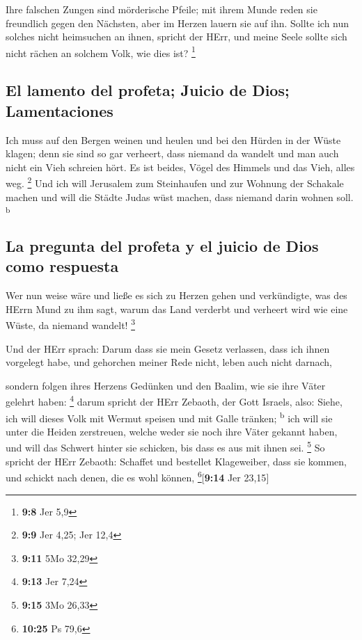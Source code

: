  Ihre falschen Zungen sind mörderische Pfeile; mit ihrem
Munde reden sie freundlich gegen den Nächsten, aber im Herzen lauern sie
auf ihn.  Sollte ich nun solches nicht heimsuchen an
ihnen, spricht der HErr, und meine Seele sollte sich nicht rächen an
solchem Volk, wie dies ist? \footnote{\textbf{9:8} Jer 5,9}

\hypertarget{el-lamento-del-profeta-juicio-de-dios-lamentaciones}{%
\subsection{El lamento del profeta; Juicio de Dios;
Lamentaciones}\label{el-lamento-del-profeta-juicio-de-dios-lamentaciones}}

 Ich muss auf den Bergen weinen und heulen und bei den
Hürden in der Wüste klagen; denn sie sind so gar verheert, dass niemand
da wandelt und man auch nicht ein Vieh schreien hört. Es ist beides,
Vögel des Himmels und das Vieh, alles weg. \footnote{\textbf{9:9} Jer
  4,25; Jer 12,4}  Und ich will Jerusalem zum Steinhaufen
und zur Wohnung der Schakale machen und will die Städte Judas wüst
machen, dass niemand darin wohnen soll. \textsuperscript{b}

\hypertarget{la-pregunta-del-profeta-y-el-juicio-de-dios-como-respuesta}{%
\subsection{La pregunta del profeta y el juicio de Dios como
respuesta}\label{la-pregunta-del-profeta-y-el-juicio-de-dios-como-respuesta}}

 Wer nun weise wäre und ließe es sich zu Herzen gehen und
verkündigte, was des HErrn Mund zu ihm sagt, warum das Land verderbt und
verheert wird wie eine Wüste, da niemand wandelt! \footnote{\textbf{9:11}
  5Mo 32,29}

 Und der HErr sprach: Darum dass sie mein Gesetz
verlassen, dass ich ihnen vorgelegt habe, und gehorchen meiner Rede
nicht, leben auch nicht darnach,

 sondern folgen ihres Herzens Gedünken und den Baalim,
wie sie ihre Väter gelehrt haben: \footnote{\textbf{9:13} Jer 7,24}
 darum spricht der HErr Zebaoth, der Gott Israels, also:
Siehe, ich will dieses Volk mit Wermut speisen und mit Galle tränken;
\textsuperscript{b}  ich will sie unter die Heiden
zerstreuen, welche weder sie noch ihre Väter gekannt haben, und will das
Schwert hinter sie schicken, bis dass es aus mit ihnen sei. \footnote{\textbf{9:15}
  3Mo 26,33}  So spricht der HErr Zebaoth: Schaffet und
bestellet Klageweiber, dass sie kommen, und schickt nach denen, die es
wohl können, \footnote{\textbf{10:25} Ps 79,6}{[}\textbf{9:14} Jer
23,15{]}

